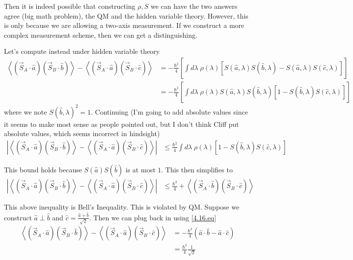 \documentclass[10pt]{report}
\newcommand{\abs}[1]{\left|#1\right|}
\newcommand{\expvalue}[1]{\left<#1\right>}
\begin{document}
Then it is indeed possible that constructing $\rho,S$ we can have the two answers agree (big math problem), the QM and the hidden variable theory. However, this is only because we are allowing a two-axis measurement. If we construct a more complex measurement scheme, then we can get a distinguishing.

Let's compute instead under hidden variable theory
\begin{align}
    \expvalue{(\vec{S}_A \cdot \hat{a})(\vec{S}_B\cdot\hat{b})} - \expvalue{(\vec{S}_A \cdot \hat{a})(\vec{S}_B\cdot\hat{c})} &= -\frac{\hbar^2}{4}\left[ \int\limits_{}^{}d\lambda\;\rho(\lambda)\left[ S(\hat{a},\lambda)S(\hat{b},\lambda) - S(\hat{a},\lambda)S(\hat{c},\lambda) \right] \right]\\
    &=-\frac{\hbar^2}{4}\left[ \int\limits_{}^{}d\lambda\;\rho(\lambda)S(\hat{a},\lambda)S(\hat{b},\lambda)\left[ 1 - S(\hat{b},\lambda)S(\hat{c},\lambda) \right] \right]
\end{align}
where we note $S(\hat{b},\lambda)^2 = 1$. Continuing (I'm going to add absolute values since it seems to make most sense as people pointed out, but I don't think Cliff put absolute values, which seems incorrect in hindsight)
\begin{align}
    \abs{\expvalue{(\vec{S}_A \cdot \hat{a})(\vec{S}_B\cdot\hat{b})} - \expvalue{(\vec{S}_A \cdot \hat{a})(\vec{S}_B\cdot\hat{c})} }&\leq \frac{\hbar^2}{4}\int\limits_{}^{}d\lambda\;\rho(\lambda)\left[ 1 - S(\hat{b},\lambda)S(\hat{c},\lambda)\right]
\end{align}

This bound holds because $S(\hat{a})S(\hat{b})$ is at most $1$. This then simplifies to
\begin{align}
    \abs{\expvalue{(\vec{S}_A \cdot \hat{a})(\vec{S}_B\cdot\hat{b})} - \expvalue{(\vec{S}_A \cdot \hat{a})(\vec{S}_B\cdot\hat{c})}} &\leq \frac{\hbar^2}{4} + \expvalue{(\vec{S}_A \cdot \hat{b})(\vec{S}_B\cdot\hat{c})}
\end{align}

This above inequality is Bell's Inequality. This is violated by QM. Suppose we construct $\hat{a} \perp \hat{b}$ and $\hat{c} = \frac{\hat{a} + \hat{b}}{\sqrt{2}}$. Then we can plug back in using \eqref{4.16.eq}
\begin{align}
    \expvalue{(\vec{S}_A \cdot \hat{a})(\vec{S}_B\cdot\hat{b})} - \expvalue{(\vec{S}_A \cdot \hat{a})(\vec{S}_B\cdot\hat{c})} &= -\frac{\hbar^2}{4}\left( \hat{a}\cdot \hat{b} - \hat{a} \cdot \hat{c} \right)\\
    &= \frac{\hbar^2}{4}\frac{1}{\sqrt{2}}
\end{align}
\end{document}
